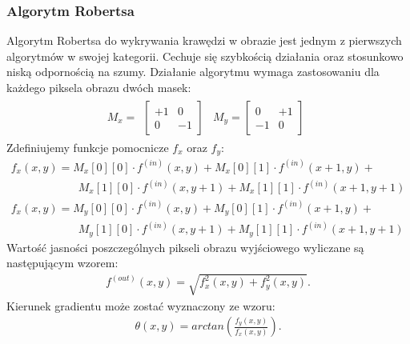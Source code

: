 \subsubsection{Algorytm Robertsa}
Algorytm Robertsa do wykrywania krawędzi w obrazie jest jednym z pierwszych algorytmów w swojej kategorii. Cechuje się szybkością działania oraz stosunkowo niską odpornością na szumy. Działanie algorytmu wymaga zastosowaniu dla każdego piksela obrazu dwóch masek:
\begin{gather*}
  M_x = \begin{matrix}
    \begin{bmatrix}
      +1 & 0 \\
      0 & -1
    \end{bmatrix}
    &
    M_y = \begin{bmatrix}
      0 & +1 \\
      -1 & 0
    \end{bmatrix}
  \end{matrix}
\end{gather*}
Zdefiniujemy funkcje pomocnicze $f_x$ oraz $f_y$:
\begin{gather*}
  f_x(x, y) = M_x[0][0] \cdot f^{(in)}(x, y) + M_x[0][1] \cdot f^{(in)}(x+1, y) +\\ \quad\quad\quad\quad\quad\quad M_x[1][0] \cdot f^{(in)}(x, y+1) + M_x[1][1] \cdot f^{(in)}(x+1, y+1) \\
  f_x(x, y) = M_y[0][0] \cdot f^{(in)}(x, y) + M_y[0][1] \cdot f^{(in)}(x+1, y) +\\ \quad\quad\quad\quad\quad\quad M_y[1][0] \cdot f^{(in)}(x, y+1) + M_y[1][1] \cdot f^{(in)}(x+1, y+1)
\end{gather*}
Wartość jasności poszczególnych pikseli obrazu wyjściowego wyliczane są następującym wzorem:
\begin{gather*}
  f^{(out)}(x, y) = \sqrt{f_x^2(x, y)+f_{y}^2(x, y)}.
\end{gather*}
Kierunek gradientu może zostać wyznaczony ze wzoru:
\begin{gather*}
  \theta(x, y) = arctan(\frac{f_{y}(x, y)}{f_{x}(x, y)}).
\end{gather*}
